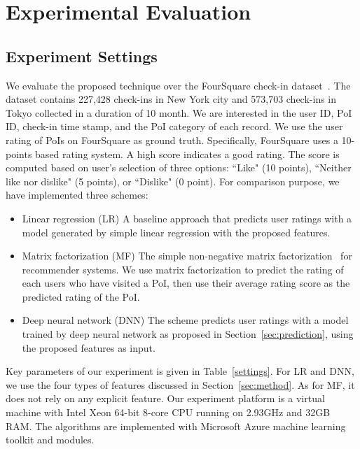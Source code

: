 \section{Experimental Evaluation}\label{sec:exp}

\subsection{Experiment Settings}

We evaluate the proposed technique over the FourSquare check-in dataset~\cite{yang2014modeling}. The dataset contains 227,428 check-ins in New York city and 573,703 check-ins in Tokyo collected in a duration of 10 month. We are interested in the user ID, PoI ID, check-in time stamp, and the PoI category of each record. We use the user rating of PoIs on FourSquare as ground truth. Specifically, FourSquare uses a 10-points based rating system. A high score indicates a good rating. The score is computed based on user's selection of three options: ``Like" (10 points), ``Neither like nor dislike" (5 points), or ``Dislike" (0 point). For comparison purpose, we have implemented three schemes:
\begin{itemize}
\item{Linear regression (LR)} A baseline approach that predicts user ratings with a model generated by simple linear regression with the proposed features.
\item{Matrix factorization (MF)} The simple non-negative matrix factorization~\cite{koren2009matrix} for recommender systems. We use matrix factorization to predict the rating of each users who have visited a PoI, then use their average rating score as the predicted rating of the PoI.
\item{Deep neural network (DNN)} The scheme predicts user ratings with a model trained by deep neural network as proposed in Section~\ref{sec:prediction}, using the proposed features as input.
\end{itemize}

Key parameters of our experiment is given in Table~\ref{settings}. For LR and DNN, we use the four types of features discussed in Section~\ref{sec:method}. As for MF, it does not rely on any explicit feature. Our experiment platform is a virtual machine with Intel Xeon 64-bit 8-core CPU running on 2.93GHz and 32GB RAM. The algorithms are implemented with Microsoft Azure machine learning toolkit and modules. 

